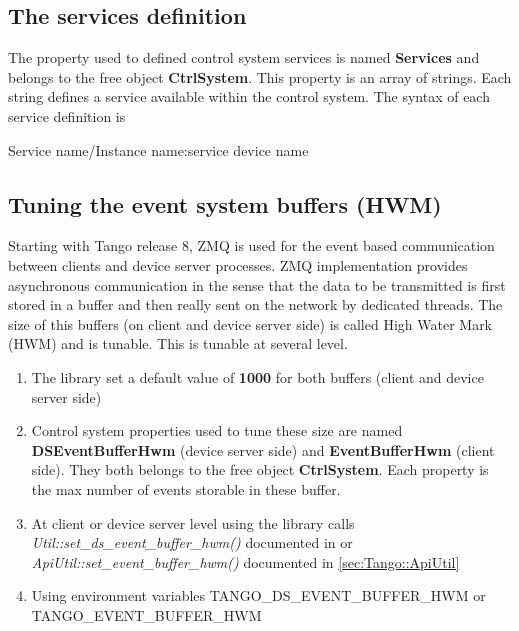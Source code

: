\subsection{The services definition}

The property used to defined control system services is named \textbf{Services}
and belongs to the free object \textbf{CtrlSystem}.
This property is an array of strings. Each string defines a service
available within the control system. The syntax of each service definition
is \begin{center}Service name/Instance name:service device name\end{center}


\subsection{Tuning the event system buffers (HWM)}

Starting with Tango release 8, ZMQ is used for the event
based communication between clients and device server processes. ZMQ
implementation provides asynchronous communication in the sense that
the data to be transmitted is first stored in a buffer and then really
sent on the network by dedicated threads. The size of this buffers
(on client and device server side) is called High Water Mark (HWM)
and is tunable. This is tunable at several level.
\begin{enumerate}
\item The library set a default value of \textbf{1000} for both buffers
(client and device server side)
\item Control system properties used to tune these size are named \textbf{DSEventBufferHwm}
(device server side) and \textbf{EventBufferHwm}
(client side). They both belongs to the free object \textbf{CtrlSystem}.
Each property is the max number of events storable in these buffer.
\item At client or device server level using the library calls \emph{Util::set\_ds\_event\_buffer\_hwm()}
documented in \cite{Tango-dsclasses-doc} or \emph{ApiUtil::set\_event\_buffer\_hwm()
}documented in \ref{sec:Tango::ApiUtil}
\item Using environment variables TANGO\_DS\_EVENT\_BUFFER\_HWM
or TANGO\_EVENT\_BUFFER\_HWM
\end{enumerate}

